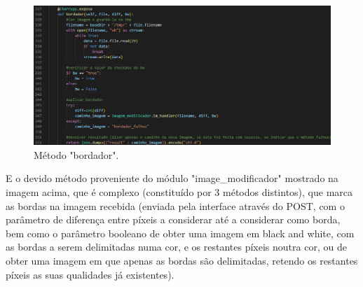 \documentclass{report}
\begin{document}
    \begin{figure}[!hbtp]
        \centering
        \includegraphics[scale=0.54]{Images_code/13 - image manipulation app bordador.png}
        \caption{\label{Estrutura}Método "bordador".}
\end{figure}

\linebreak
 \bigskip
 \bigskip
 \bigskip
 
    E o devido método proveniente do módulo "image\_modificador" mostrado na imagem acima, que é complexo (constituído por 3 métodos distintos), que marca as bordas na imagem recebida (enviada pela interface através do POST, com o parâmetro de diferença entre píxeis a considerar até a considerar como borda, bem como o parâmetro booleano de obter uma imagem em black and white, com as bordas a serem delimitadas numa cor, e os restantes píxeis noutra cor, ou de obter uma imagem em que apenas as bordas são delimitadas, retendo os restantes píxeis as suas qualidades já existentes).


\newpage
\end{document}

